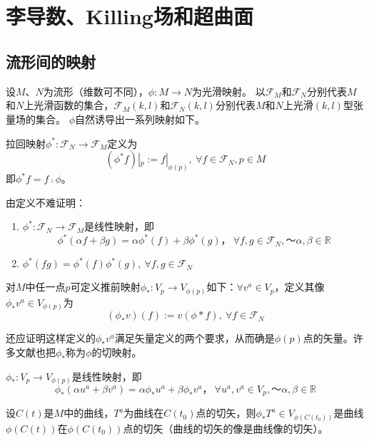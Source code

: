 \chapter[李导数、Killing场和超曲面]{\\李导数、Killing场和超曲面}

\section{流形间的映射}

设$M$、$N$为流形（维数可不同），$\phi \colon M \to N$为光滑映射。
以$\mathscr{F}_M$和$\mathscr{F}_N$分别代表$M$和$N$上光滑函数的集合，$\mathscr{F}_M(k, l)$和$\mathscr{F}_N(k, l)$分别代表$M$和$N$上光滑$(k,l)$型张量场的集合。
$\phi$自然诱导出一系列映射如下。

\begin{definition}
拉回映射$\phi^* \colon \mathscr{F}_N \to \mathscr{F}_M$定义为
$$(\phi^*f)|_p := f|_{\phi(p)}, ~ \forall f \in \mathscr{F}_N, p \in M$$
即$\phi^*f = f \comp \phi$。
\end{definition}

由定义不难证明：
\begin{enumerate}[（1）]
\item $\phi^* \colon \mathscr{F}_N \to \mathscr{F}_M$是线性映射，即
$$\phi^*(\alpha f + \beta g) = \alpha\phi^*(f) + \beta\phi^*(g)， ~ \forall f,g \in \mathscr{F}_N, ～ \alpha,\beta \in \mathbb{R}$$
\item $\phi^*(fg) = \phi^*(f)\phi^*(g), ~ \forall f,g \in \mathscr{F}_N$
\end{enumerate}

\begin{definition}
对$M$中任一点$p$可定义推前映射$\phi_* \colon V_p \to V_{\phi(p)}$如下：$\forall v^a \in V_p$，定义其像$\phi_*v^a \in V_{\phi(p)}$为
$$(\phi_*v)(f) := v(\phi*f), ~ \forall f \in \mathscr{F}_N$$
\end{definition}

还应证明这样定义的$\phi_*v^a$满足矢量定义的两个要求，从而确是$\phi(p)$点的矢量。许多文献也把$\phi_*$称为$\phi$的切映射。

\begin{theorem}
$\phi_* \colon V_p \to V_{\phi(p)}$是线性映射，即
$$\phi_*(\alpha u^a + \beta v^a) = \alpha\phi_*u^a + \beta\phi_*v^a， ~ \forall u^a,v^a \in V_p, ～ \alpha,\beta \in \mathbb{R}$$
\end{theorem}

\begin{theorem}
设$C(t)$是$M$中的曲线，$T^a$为曲线在$C(t_0)$点的切矢，则$\phi_*T^a \in V_{\phi(C(t_0))}$是曲线$\phi(C(t))$在$\phi(C(t_0))$点的切矢（曲线的切矢的像是曲线像的切矢）。
\end{theorem}

